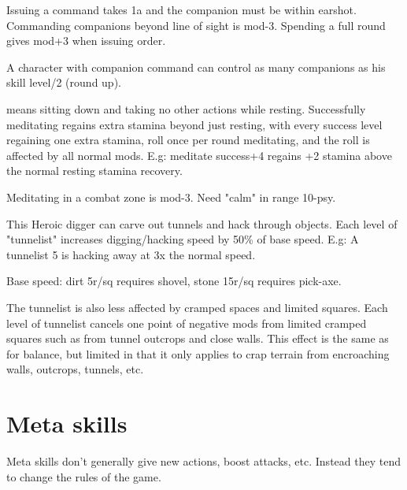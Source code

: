 Issuing a command takes 1a and the companion must be within earshot. Commanding companions beyond line of sight is mod-3. Spending a full round gives mod+3 when issuing order.

A character with companion command can control as many companions as his skill level/2 (round up).


 means sitting down and taking no other actions while resting. Successfully meditating regains extra stamina beyond just resting, with every success level regaining one extra stamina, roll once per round meditating, and the roll is affected by all normal mods. E.g: meditate success+4 regains +2 stamina above the normal resting stamina recovery.

Meditating in a combat zone is mod-3. Need "calm" in range 10-psy.


 This Heroic digger can carve out tunnels and hack through objects. Each level of "tunnelist" increases digging/hacking speed by 50\% of base speed. E.g: A tunnelist 5 is hacking away at 3x the normal speed.

Base speed: dirt 5r/sq requires shovel, stone 15r/sq requires pick-axe.

The tunnelist is also less affected by cramped spaces and limited squares. Each level of tunnelist cancels one point of negative mods from limited cramped squares such as from tunnel outcrops and close walls. This effect is the same as for balance, but limited in that it only applies to crap terrain from encroaching walls, outcrops, tunnels, etc.


\closeskillslist


















\section*{Meta skills}

Meta skills don't generally give new actions, boost attacks, etc. Instead they tend to change the rules of the game.



